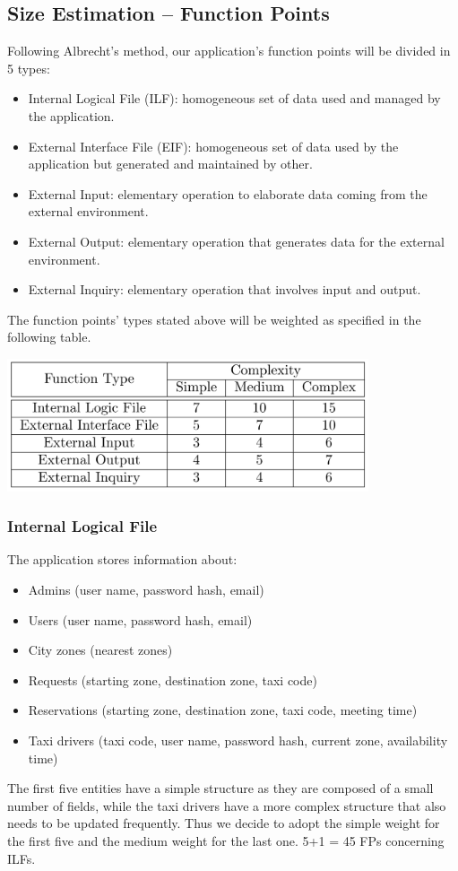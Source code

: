 \documentclass{article}
\begin{document}
\subsection{Size Estimation -- Function Points}
Following Albrecht's method, our application's function points
will be divided in 5 types:
\begin{itemize}
	\item Internal Logical File (ILF): homogeneous set of data used
	and managed by the application.
	\item External Interface File (EIF): homogeneous set of data 
	used by the application but generated and maintained by other.
	\item External Input: elementary operation to elaborate data
	coming from the external environment.
	\item External Output: elementary operation that generates data
	for the external environment.
	\item External Inquiry: elementary operation that involves
	input and output.
\end{itemize}
The function points' types stated above will be weighted as 
specified in the following table.
\begin{center}
	\includegraphics[width = 0.8\textwidth]{FP}
\end{center}
\subsubsection{Internal Logical File}
The application stores information about: 
\begin{itemize}
	\item Admins (user name, password hash, email)
	\item Users (user name, password hash, email)
	\item City zones (nearest zones)
	\item Requests (starting zone, destination zone, taxi code)
	\item Reservations (starting zone, destination zone, taxi code, meeting time)
	\item Taxi drivers (taxi code, user name, password hash, current zone, availability time)
\end{itemize}
The first five entities have a simple structure as they are composed 
of a small number of fields, while the taxi drivers have a more complex
structure that also needs to be updated frequently. Thus we decide to 
adopt the simple weight for the first five and the medium weight
for the last one.
5+1 = 45 FPs concerning ILFs.
\end{document}

